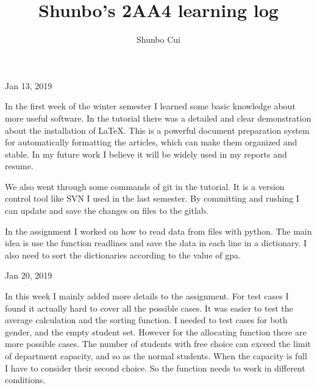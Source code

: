 \documentclass{article}
\title{Shunbo's 2AA4 learning log}
\author{Shunbo Cui}
\date{}
\begin{document}
\maketitle

\begin{flushleft}
Jan 13, 2019
\end{flushleft}
\par
In the first week of the winter semester I learned some basic knowledge about more useful software. In the tutorial there was a detailed and clear demonstration about the installation of LaTeX. This is a powerful document preparation system for automatically formatting the articles, which can make them organized and stable. In my future work I believe it will be widely used in my reports and resume.  \par
We also went through some commands of git in the tutorial. It is a version control tool like SVN I used in the last semester. By committing and rushing I can update and save the changes on files to the gitlab.\par
In the assignment I worked on how to read data from files with python. The main idea is use the function readlines and save the data in each line in a dictionary. I also need to sort the dictionaries according to the value of gpa.

\begin{flushleft}
Jan 20, 2019
\end{flushleft}
\par
In this week I mainly added more details to the assignment. For test cases I found it actually hard to cover all the possible cases. It was easier to test the average calculation and the sorting function. I needed to test cases for both gender, and the empty student set. However for the allocating function there are more possible cases. The number of students with free choice can exceed the limit of department capacity, and so as the normal students. When the capacity is full I have to consider their second choice. So the function needs to work in different conditions.\par
\end{document}
